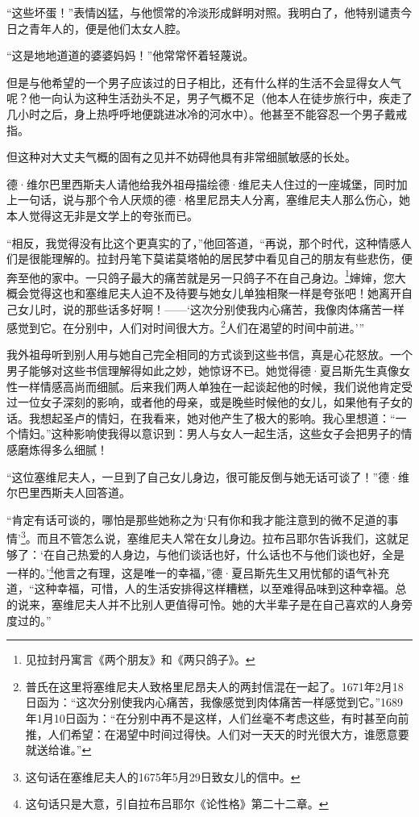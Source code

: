 \par “这些坏蛋！”表情凶猛，与他惯常的冷淡形成鲜明对照。我明白了，他特别谴责今日之青年人的，便是他们太女人腔。
\par “这是地地道道的婆婆妈妈！”他常常怀着轻蔑说。
\par 但是与他希望的一个男子应该过的日子相比，还有什么样的生活不会显得女人气呢？他一向认为这种生活劲头不足，男子气概不足（他本人在徒步旅行中，疾走了几小时之后，身上热呼呼地便跳进冰冷的河水中）。他甚至不能容忍一个男子戴戒指。
\par 但这种对大丈夫气概的固有之见并不妨碍他具有非常细腻敏感的长处。
\par 德·维尔巴里西斯夫人请他给我外祖母描绘德·维尼夫人住过的一座城堡，同时加上一句话，说与那个令人厌烦的德·格里尼昂夫人分离，塞维尼夫人那么伤心，她本人觉得这无非是文学上的夸张而已。
\par “相反，我觉得没有比这个更真实的了，”他回答道，“再说，那个时代，这种情感人们是很能理解的。拉封丹笔下莫诺莫塔帕的居民梦中看见自己的朋友有些悲伤，便奔至他的家中。一只鸽子最大的痛苦就是另一只鸽子不在自己身边。\footnote{见拉封丹寓言《两个朋友》和《两只鸽子》。}婶婶，您大概会觉得这也和塞维尼夫人迫不及待要与她女儿单独相聚一样是夸张吧！她离开自己女儿时，说的那些话多好啊！——‘这次分别使我内心痛苦，我像肉体痛苦一样感觉到它。在分别中，人们对时间很大方。\footnote{普氏在这里将塞维尼夫人致格里尼昂夫人的两封信混在一起了。1671年2月18日函为：“这次分别使我内心痛苦，我像感觉到肉体痛苦一样感觉到它。”1689年1月10日函为：“在分别中再不是这样，人们丝毫不考虑这些，有时甚至向前推，人们希望：在渴望中时间过得快。人们对一天天的时光很大方，谁愿意要就送给谁。”}人们在渴望的时间中前进。’”
\par 我外祖母听到别人用与她自己完全相同的方式谈到这些书信，真是心花怒放。一个男子能够对这些书信理解得如此之妙，她惊讶不已。她觉得德·夏吕斯先生真像女性一样情感高尚而细腻。后来我们两人单独在一起谈起他的时候，我们说他肯定受过一位女子深刻的影响，或者他的母亲，或是晚些时候他的女儿，如果他有子女的话。我想起圣卢的情妇，在我看来，她对他产生了极大的影响。我心里想道：“一个情妇。”这种影响使我得以意识到：男人与女人一起生活，这些女子会把男子的情感磨炼得多么细腻！
\par “这位塞维尼夫人，一旦到了自己女儿身边，很可能反倒与她无话可谈了！”德·维尔巴里西斯夫人回答道。
\par “肯定有话可谈的，哪怕是那些她称之为‘只有你和我才能注意到的微不足道的事情’\footnote{这句话在塞维尼夫人的1675年5月29日致女儿的信中。}。而且不管怎么说，塞维尼夫人常在女儿身边。拉布吕耶尔告诉我们，这就足够了：‘在自己热爱的人身边，与他们谈话也好，什么话也不与他们谈也好，全是一样的。’\footnote{这句话只是大意，引自拉布吕耶尔《论性格》第二十二章。}他言之有理，这是唯一的幸福，”德·夏吕斯先生又用忧郁的语气补充道，“这种幸福，可惜，人的生活安排得这样糟糕，以至难得品味到这种幸福。总的说来，塞维尼夫人并不比别人更值得可怜。她的大半辈子是在自己喜欢的人身旁度过的。”
